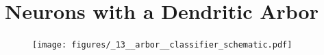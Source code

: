 \documentclass[twocolumn]{article}
\begin{document}
\section{\label{sec:dendritic_arbor}Neurons with a Dendritic Arbor}

%

\begin{figure}[h!]
\texttt{[image: figures/\_13\_\_arbor\_\_classifier\_schematic.pdf]}
\end{figure}

\end{document}
